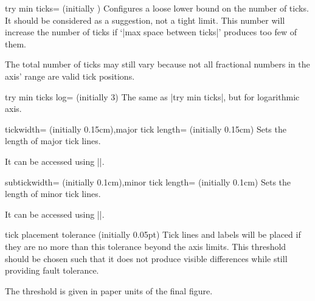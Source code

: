 \begin{pgfplotskey}{try min ticks= (initially \axisdefaulttryminticks)}
	Configures a loose lower bound on the number of ticks. It should be considered as a suggestion, not a tight limit. This number will increase the number of ticks if `|max space between ticks|' produces too few of them.

	The total number of ticks may still vary because not all fractional numbers in the axis' range are valid tick positions.
\end{pgfplotskey}

\begin{pgfplotskey}{try min ticks log= (initially 3)}
	The same as |try min ticks|, but for logarithmic axis.
\end{pgfplotskey}

\begin{pgfplotskeylist}{tickwidth= (initially 0.15cm),major tick length= (initially 0.15cm)}
	Sets the length of major tick lines. 
	
	It can be accessed using ||.
\end{pgfplotskeylist}

\begin{pgfplotskeylist}{subtickwidth= (initially 0.1cm),minor tick length= (initially 0.1cm)}
	Sets the length of minor tick lines.

	It can be accessed using ||.
\end{pgfplotskeylist}

\begin{pgfplotsxykeylist}{\x tick placement tolerance (initially 0.05pt)}
	Tick lines and labels will be placed if they are no more than this tolerance beyond the axis limits. This threshold should be chosen such that it does not produce visible differences while still providing fault tolerance.

	The threshold is given in paper units of the final figure.
\end{pgfplotsxykeylist}

